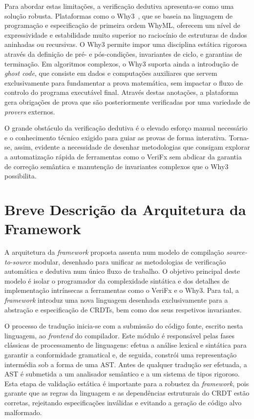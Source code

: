 \documentclass{llncs}
\begin{document}
Para abordar estas limitações, a verificação dedutiva apresenta-se como uma solução robusta. Plataformas como o Why3~\cite{why3},
que se baseia na linguagem de programação e especificação de primeira ordem WhyML,
oferecem um nível de expressividade e estabilidade muito superior no raciocínio de estruturas de dados aninhadas ou recursivas.
O Why3 permite impor uma disciplina estática rigorosa através da definição de pré- e pós-condições, invariantes de ciclo,
e garantias de terminação. Em algoritmos complexos, o Why3 suporta ainda a introdução de \textit{ghost code},
que consiste em dados e computações auxiliares que servem exclusivamente para fundamentar a prova matemática,
sem impactar o fluxo de controlo do programa executável final. Através destas anotações,
a plataforma gera obrigações de prova que são posteriormente verificadas por uma variedade de \textit{provers} externos.

O grande obstáculo da verificação dedutiva é o elevado esforço manual necessário e o conhecimento técnico exigido para guiar as provas de forma interativa.
Torna-se, assim, evidente a necessidade de desenhar metodologias que consigam explorar a automatização rápida de ferramentas como o VeriFx sem abdicar da garantia de correção semântica
e manutenção de invariantes complexos que o Why3 possibilita.

\section{Breve Descrição da Arquitetura da Framework}

A arquitetura da \textit{framework} proposta assenta num modelo de compilação \textit{source-to-source} modular,
desenhado para unificar as metodologias de verificação automática e dedutiva num único fluxo de trabalho.
O objetivo principal deste modelo é isolar o programador da complexidade sintática e dos detalhes de implementação intrínsecas a ferramentas como o VeriFx e o Why3.
Para tal, a \textit{framework} introduz uma nova linguagem desenhada exclusivamente para a abstração e especificação de CRDTs,
bem como dos seus respetivos invariantes.

O processo de tradução inicia-se com a submissão do código fonte, escrito nesta linguagem, ao \textit{frontend} do compilador.
Este módulo é responsável pelas fases clássicas de processamento de linguagens: efetua a análise lexical e sintática para garantir a conformidade gramatical e,
de seguida, constrói uma representação intermédia sob a forma de uma AST.
Antes de qualquer tradução ser efetuada, a AST é submetida a um analisador semântico e a um sistema de tipos rigoroso.
Esta etapa de validação estática é importante para a robustez da \textit{framework}, pois garante que as regras da linguagem e as dependências estruturais do CRDT estão corretas,
rejeitando especificações inválidas e evitando a geração de código alvo malformado.
\end{document}
